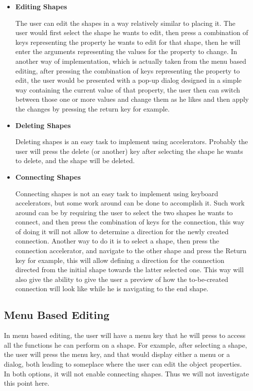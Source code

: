 \begin{itemize}
\item {\bf Editing Shapes}
\par \noindent
	The user can edit the shapes in a way relatively similar to placing it. The user would first select the shape he wants to edit, then press a combination of keys representing the property he wants to edit for that shape, then he will enter the arguments representing the values for the property to change. In another way of implementation, which is actually taken from the menu based editing, after pressing the combination of keys representing the property to edit, the user would be presented with a pop-up dialog  designed in a simple way containing the current value of that property, the user then can switch between those one or more values and change them as he likes and then apply the changes by pressing the return key for example.

\item {\bf Deleting Shapes}
\par \noindent
	Deleting shapes is an easy task to implement using accelerators. Probably the user will press the delete (or another) key after selecting the shape he wants to delete, and the shape will be deleted.

\item {\bf Connecting Shapes}
\par \noindent
Connecting shapes is not an easy task to implement using keyboard accelerators, but some work around can be done to accomplish it. Such work around can be by requiring the user to select the two shapes he wants to connect, and then press the combination of keys for the connection, this way of doing it will not allow to determine a direction for the newly created connection. Another way to do it is to select a shape,  then press the connection accelerator, and navigate to the other shape and press the Return key for example, this will allow defining a direction for the connection directed from the initial shape towards the latter selected one. This way will also give the ability to give the user a preview of how the to-be-created connection will look like while he is navigating to the end shape.

\end{itemize}

\subsection{Menu Based Editing}
\par \noindent
In menu based editing, the user will have a menu key that he will press to access all the functions he can perform on a shape. For example, after selecting a shape, the user will press the menu key, and that would display either a menu or a dialog, both leading to someplace where the user can edit the object properties. In both options, it will not enable connecting shapes. Thus we will not investigate this point here.

